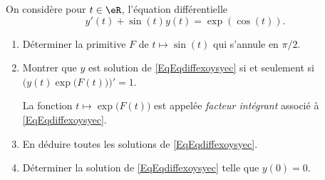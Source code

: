 
\begin{exercice}\label{exoTD6-0001}

	On considère pour $t\in\eR$, l'équation différentielle
	\begin{equation}		\label{EqEqdiffexoysyec}
		y'(t)+\sin(t)y(t)=\exp(\cos(t)).
	\end{equation}
	\begin{enumerate}
		\item
			Déterminer la primitive $F$ de $t\mapsto\sin(t)$ qui s'annule en $\pi/2$.
		\item
			Montrer que $y$ est solution de \eqref{EqEqdiffexoysyec} si et seulement si $\Big( y(t)\exp\big( F(t) \big) \Big)'=1$.

			La fonction $t\mapsto\exp\big( F(t) \big)$ est appelée \emph{facteur intégrant} associé à \eqref{EqEqdiffexoysyec}.
		\item
			En déduire toutes les solutions de \eqref{EqEqdiffexoysyec}.
		\item
			Déterminer la solution de \eqref{EqEqdiffexoysyec} telle que $y(0)=0$.

	\end{enumerate}

\end{exercice}
